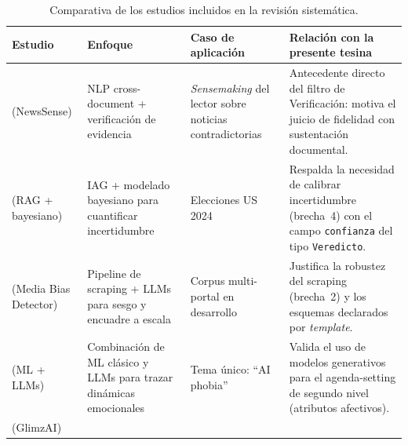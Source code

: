 \documentclass[12pt]{report}
\begin{document}
\begin{table}[!htbp]
  \centering
  \caption{Comparativa de los estudios incluidos en la revisión sistemática.}
  \label{tab:comparativa-estudios}
  \footnotesize
  \setlength{\tabcolsep}{3pt}
  \begin{tabularx}{\textwidth}{@{}>{\raggedright\arraybackslash}p{2.4cm} >{\raggedright\arraybackslash}p{2.5cm} >{\raggedright\arraybackslash}p{2.7cm} >{\raggedright\arraybackslash}X@{}}
    \toprule
    \textbf{Estudio} & \textbf{Enfoque}                                                                                                        & \textbf{Caso de aplicación} & \textbf{Relación con la presente tesina} \\
    \midrule
    \citet{milbauer2023} (NewsSense)
                     & NLP cross-document + verificación de evidencia
                     & \textit{Sensemaking} del lector sobre noticias contradictorias
                     & Antecedente directo del filtro de Verificación: motiva el juicio de fidelidad con sustentación documental.                                                                                       \\
    \addlinespace
    \citet{pavlyshenko2024} (RAG + bayesiano)
                     & IAG + modelado bayesiano para cuantificar incertidumbre
                     & Elecciones US 2024
                     & Respalda la necesidad de calibrar incertidumbre (brecha~4) con el campo \texttt{confianza} del tipo \texttt{Veredicto}.                                                                          \\
    \addlinespace
    \citet{haider2025} (Media Bias Detector)
                     & Pipeline de scraping + LLMs para sesgo y encuadre a escala
                     & Corpus multi-portal en desarrollo
                     & Justifica la robustez del scraping (brecha~2) y los esquemas declarados por \textit{template}.                                                                                                   \\
    \addlinespace
    \citet{samuel2025} (ML + LLMs)
                     & Combinación de ML clásico y LLMs para trazar dinámicas emocionales
                     & Tema único: ``AI phobia''
                     & Valida el uso de modelos generativos para el agenda-setting de segundo nivel (atributos afectivos).                                                                                              \\
    \addlinespace
    \citet{behbahanian} (GlimzAI)

\end{tabularx}
\end{table}
\end{document}

